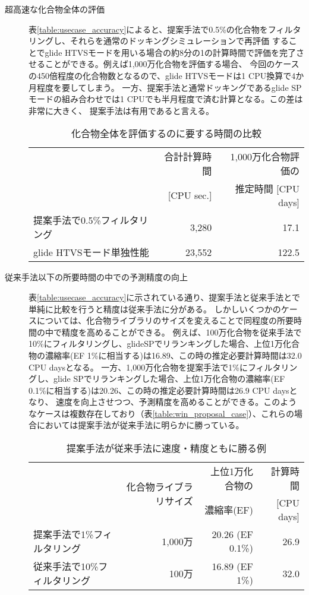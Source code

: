 \begin{description}
\item[超高速な化合物全体の評価]
	表\ref{table:usecase_accuracy}によると、提案手法で0.5\%の化合物をフィルタリングし、それらを通常のドッキングシミュレーションで再評価
	することでglide HTVSモードを用いる場合の約8分の1の計算時間で評価を完了させることができる。例えば1,000万化合物を評価する場合、
	今回のケースの450倍程度の化合物数となるので、glide HTVSモードは1 CPU換算で4か月程度を要してしまう。
	一方、提案手法と通常ドッキングであるglide SPモードの組み合わせでは1 CPUでも半月程度で済む計算となる。この差は非常に大きく、
	提案手法は有用であると言える。
\begin{table}[htbp] \centering
	\caption{化合物全体を評価するのに要する時間の比較}
	\label{calc_speed_ultrafast}
	\begin{tabular}{l|rr}
	\hline
												&合計計算時間	&1,000万化合物評価の		\\ 
												&[CPU sec.]		&推定時間 [CPU days]		\\ \hline
	提案手法で0.5\%フィルタリング	&3,280				&17.1								\\
	glide HTVSモード単独性能		&23,552				&122.5								\\ \hline
	\end{tabular}
\end{table}

\item[従来手法以下の所要時間の中での予測精度の向上]
	表\ref{table:usecase_accuracy}に示されている通り、提案手法と従来手法とで単純に比較を行うと精度は従来手法に分がある。
	しかしいくつかのケースについては、化合物ライブラリのサイズを変えることで同程度の所要時間の中で精度を高めることができる。
	例えば、100万化合物を従来手法で10\%にフィルタリングし、glideSPでリランキングした場合、上位1万化合物の濃縮率(EF 1\%に相当する)は16.89、この時の推定必要計算時間は32.0 CPU daysとなる。
	一方、1,000万化合物を提案手法で1\%にフィルタリングし、glide SPでリランキングした場合、上位1万化合物の濃縮率(EF 0.1\%に相当する)は20.26、この時の推定必要計算時間は26.9 CPU daysとなり、
	速度を向上させつつ、予測精度を高めることができる。このようなケースは複数存在しており（表\ref{table:win_proposal_case}）、これらの場合においては提案手法が従来手法に明らかに勝っている。
\begin{table}[htbp] \centering
	\caption{提案手法が従来手法に速度・精度ともに勝る例}
	\label{table:win_propsal_case}
	\begin{tabular}{l|rrr}
	\hline
												&\multirow{2}{*}{化合物ライブラリサイズ}	&上位1万化合物の		&計算時間		\\
												&														&濃縮率(EF)				&[CPU days]		\\ \hline
	提案手法で1\%フィルタリング		&1,000万										&20.26 (EF 0.1\%)		&26.9				\\
	従来手法で10\%フィルタリング	&100万											&16.89 (EF 1\%)			&32.0				\\ \hline

	\end{tabular}
\end{table}
	
\end{description}
